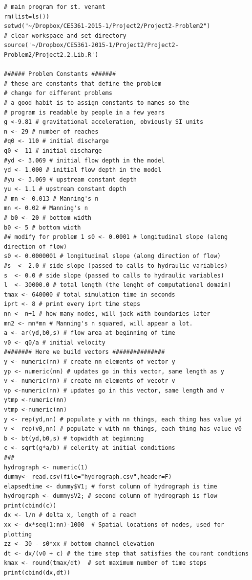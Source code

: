 \begin{verbatim}
# main program for st. venant
rm(list=ls())
setwd("~/Dropbox/CE5361-2015-1/Project2/Project2-Problem2")
# clear workspace and set directory
source('~/Dropbox/CE5361-2015-1/Project2/Project2-Problem2/Project2.2.Lib.R')

###### Problem Constants #######
# these are constants that define the problem
# change for different problems
# a good habit is to assign constants to names so the
# program is readable by people in a few years
g <-9.81 # gravitational acceleration, obviously SI units
n <- 29 # number of reaches
#q0 <- 110 # initial discharge
q0 <- 11 # initial discharge
#yd <- 3.069 # initial flow depth in the model
yd <- 1.000 # initial flow depth in the model
#yu <- 3.069 # upstream constant depth
yu <- 1.1 # upstream constant depth
# mn <- 0.013 # Manning's n
mn <- 0.02 # Manning's n
# b0 <- 20 # bottom width
b0 <- 5 # bottom width
## modify for problem 1 s0 <- 0.0001 # longitudinal slope (along direction of flow)
s0 <- 0.0000001 # longitudinal slope (along direction of flow)
#s  <- 2.0 # side slope (passed to calls to hydraulic variables)
s  <- 0.0 # side slope (passed to calls to hydraulic variables)
l  <- 30000.0 # total length (the lenght of computational domain)
tmax <- 640000 # total simulation time in seconds
iprt <- 8 # print every iprt time steps
nn <- n+1 # how many nodes, will jack with boundaries later
mn2 <- mn*mn # Manning's n squared, will appear a lot.
a <- ar(yd,b0,s) # flow area at beginning of time
v0 <- q0/a # initial velocity
######## Here we build vectors ###############
y <- numeric(nn) # create nn elements of vector y
yp <- numeric(nn) # updates go in this vector, same length as y
v <- numeric(nn) # create nn elements of vecotr v
vp <-numeric(nn) # updates go in this vector, same length and v
ytmp <-numeric(nn)
vtmp <-numeric(nn)
y <- rep(yd,nn) # populate y with nn things, each thing has value yd
v <- rep(v0,nn) # populate v with nn things, each thing has value v0
b <- bt(yd,b0,s) # topwidth at beginning
c <- sqrt(g*a/b) # celerity at initial conditions
###
hydrograph <- numeric(1)
dummy<- read.csv(file="hydrograph.csv",header=F)
elapsedtime <- dummy$V1; # forst column of hydrograph is time
hydrograph <- dummy$V2; # second column of hydrograph is flow
print(cbind(c))
dx <- l/n # delta x, length of a reach
xx <- dx*seq(1:nn)-1000  # Spatial locations of nodes, used for plotting
zz <- 30 - s0*xx # bottom channel elevation
dt <- dx/(v0 + c) # the time step that satisfies the courant condtions
kmax <- round(tmax/dt)  # set maximum number of time steps
print(cbind(dx,dt))




\end{verbatim}
